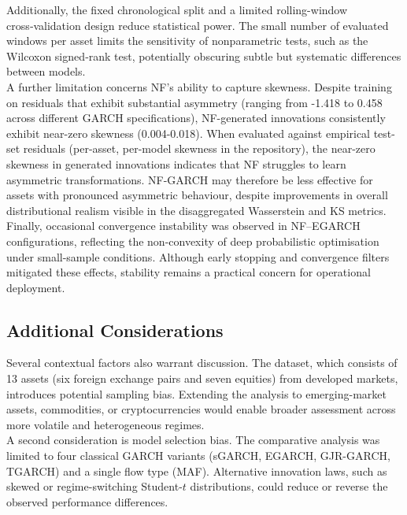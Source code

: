 \documentclass[oneside,12pt]{CUEDthesisPSnPDF}
\begin{document}
\medskip
\noindent
Additionally, the fixed chronological split and a limited rolling-window cross‑validation design reduce statistical power. The small number of evaluated windows per asset limits the sensitivity of nonparametric tests, such as the Wilcoxon signed‑rank test, potentially obscuring subtle but systematic differences between models.\\

\medskip
\noindent
A further limitation concerns NF's ability to capture skewness. Despite training on residuals that exhibit substantial asymmetry (ranging from -1.418 to 0.458 across different GARCH specifications), NF-generated innovations consistently exhibit near-zero skewness (0.004-0.018). When evaluated against empirical test-set residuals (per-asset, per-model skewness in the repository), the near-zero skewness in generated innovations indicates that NF struggles to learn asymmetric transformations. NF-GARCH may therefore be less effective for assets with pronounced asymmetric behaviour, despite improvements in overall distributional realism visible in the disaggregated Wasserstein and KS metrics.\\

\medskip
\noindent
Finally, occasional convergence instability was observed in NF–EGARCH configurations, reflecting the non-convexity of deep probabilistic optimisation under small-sample conditions. Although early stopping and convergence filters mitigated these effects, stability remains a practical concern for operational deployment.\\


\subsection*{Additional Considerations}
\noindent
Several contextual factors also warrant discussion. The dataset, which consists of 13 assets (six foreign exchange pairs and seven equities) from developed markets, introduces potential sampling bias. Extending the analysis to emerging-market assets, commodities, or cryptocurrencies would enable broader assessment across more volatile and heterogeneous regimes.\\

\medskip
\noindent
A second consideration is model selection bias. The comparative analysis was limited to four classical GARCH variants (sGARCH, EGARCH, GJR-GARCH, TGARCH) and a single flow type (MAF). Alternative innovation laws, such as skewed or regime-switching Student-$t$ distributions, could reduce or reverse the observed performance differences.\\
\end{document}
